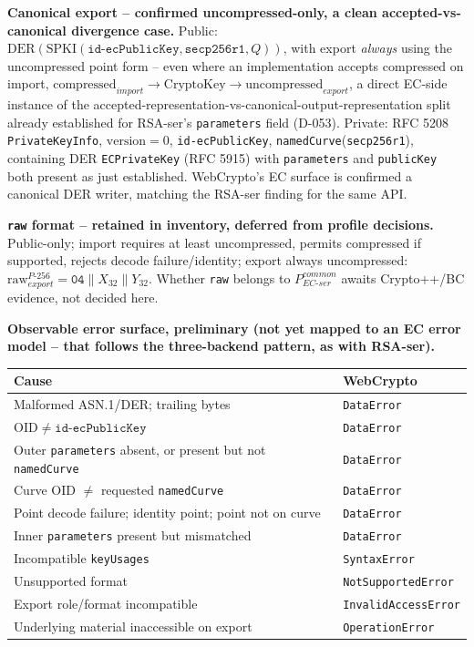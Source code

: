 \documentclass[11pt,a4paper]{article}
\begin{document}
\textbf{Canonical export -- confirmed uncompressed-only, a clean accepted-vs-canonical divergence case.} Public: $\text{DER}(\text{SPKI}(\texttt{id-ecPublicKey}, \texttt{secp256r1}, Q))$, with export \emph{always} using the uncompressed point form -- even where an implementation accepts compressed on import, $\text{compressed}_{import} \to \text{CryptoKey} \to \text{uncompressed}_{export}$, a direct EC-side instance of the accepted-representation-vs-canonical-output-representation split already established for RSA-ser's \texttt{parameters} field (D-053). Private: RFC 5208 \texttt{PrivateKeyInfo}, $\text{version}=0$, \texttt{id-ecPublicKey}, \texttt{namedCurve}(\texttt{secp256r1}), containing DER \texttt{ECPrivateKey} (RFC 5915) with \texttt{parameters} and \texttt{publicKey} both present as just established. WebCrypto's EC surface is confirmed a canonical DER writer, matching the RSA-ser finding for the same API.

\textbf{\texttt{raw} format -- retained in inventory, deferred from profile decisions.} Public-only; import requires at least uncompressed, permits compressed if supported, rejects decode failure/identity; export always uncompressed: $\text{raw}_{export}^{P\text{-}256} = \texttt{04}\|X_{32}\|Y_{32}$. Whether \texttt{raw} belongs to $P_{EC\text{-}ser}^{common}$ awaits Crypto++/BC evidence, not decided here.

\textbf{Observable error surface, preliminary (not yet mapped to an EC error model -- that follows the three-backend pattern, as with RSA-ser).}
\begin{center}
\begin{tabular}{@{}p{}p{}@{}}
\toprule
Cause & WebCrypto \\
\midrule
Malformed ASN.1/DER; trailing bytes & \texttt{DataError} \\
$\mathrm{OID}\neq\texttt{id-ecPublicKey}$ & \texttt{DataError} \\
Outer \texttt{parameters} absent, or present but not \texttt{namedCurve} & \texttt{DataError} \\
Curve OID $\neq$ requested \texttt{namedCurve} & \texttt{DataError} \\
Point decode failure; identity point; point not on curve & \texttt{DataError} \\
Inner \texttt{parameters} present but mismatched & \texttt{DataError} \\
Incompatible \texttt{keyUsages} & \texttt{SyntaxError} \\
Unsupported format & \texttt{NotSupportedError} \\
Export role/format incompatible & \texttt{InvalidAccessError} \\
Underlying material inaccessible on export & \texttt{OperationError} \\
\bottomrule
\end{tabular}
\end{center}
\end{document}
